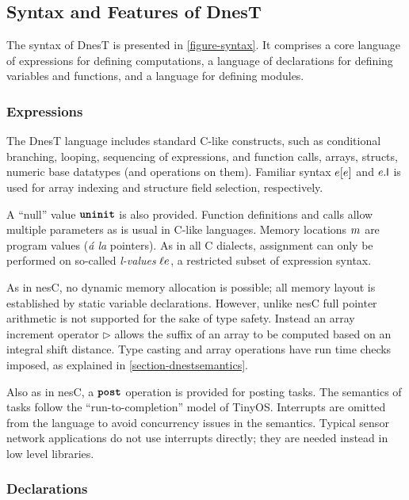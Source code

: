 \subsection{Syntax and Features of DnesT}

The syntax of DnesT is presented in \autoref{figure-syntax}. It comprises a core language of
expressions for defining computations, a language of declarations for defining variables and
functions, and a language for defining modules.

\syntaxfig

\subsubsection{Expressions}

The DnesT language includes standard C-like constructs, such as conditional branching, looping,
sequencing of expressions, and function calls, arrays, structs, numeric base data\-types (and
operations on them). Familiar syntax $e [e]$ and $e.\textsf{l}$ is used for array indexing and
structure field selection, respectively.

A ``null'' value $\mbox{\bf \texttt{uninit}}$ is also provided. Function definitions and calls allow multiple
parameters as is usual in C-like languages. Memory locations $m$ are program values
(\emph{\'a la} pointers). As in all C dialects, assignment can only be performed on so-called
\emph{l-values} $\ell e$, a restricted subset of expression syntax.

As in nesC, no dynamic memory allocation is possible; all memory layout is established by static
variable declarations. However, unlike nesC full pointer arithmetic is not supported for the
sake of type safety. Instead an array increment operator $\rhd$ allows the suffix of an array to
be computed based on an integral shift distance. Type casting and array operations have run time
checks imposed, as explained in \autoref{section-dnestsemantics}.

Also as in nesC, a $\mbox{\bf \texttt{post}}$ operation is provided for posting tasks. The semantics of tasks
follow the ``run-to-completion'' model of TinyOS. Interrupts are omitted from the language to
avoid concurrency issues in the semantics. Typical sensor network applications do not use
interrupts directly; they are needed instead in low level libraries.

\subsubsection{Declarations}

